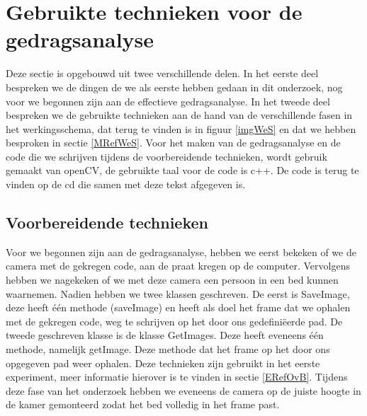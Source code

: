 \section{Gebruikte technieken voor de gedragsanalyse}
\label{MRefMGA}
Deze sectie is opgebouwd uit twee verschillende delen. In het eerste deel bespreken we de dingen de we als eerste hebben gedaan in dit onderzoek, nog voor we begonnen zijn aan de effectieve gedragsanalyse. In het tweede deel bespreken we de gebruikte technieken aan de hand van de verschillende fasen in het werkingsschema, dat terug te vinden is in figuur \ref{imgWeS} en dat we hebben besproken in sectie \ref{MRefWeS}. Voor het maken van de gedragsanalyse en de code die we schrijven tijdens de voorbereidende technieken, wordt gebruik gemaakt van openCV, de gebruikte taal voor de code is c++. De code is terug te vinden op de cd die samen met deze tekst afgegeven is. 

\subsection{Voorbereidende technieken}
Voor we begonnen zijn aan de gedragsanalyse, hebben we eerst bekeken of we de camera met de gekregen code, aan de praat kregen op de computer. Vervolgens hebben we nagekeken of we met deze camera een persoon in een bed kunnen waarnemen. Nadien hebben we twee klassen geschreven. De eerst is SaveImage, deze heeft \'e\'en methode (saveImage) en heeft als doel het frame dat we ophalen met de gekregen code, weg te schrijven op het door ons gedefini\"eerde pad. De tweede geschreven klasse is de klasse GetImages. Deze heeft eveneens \'e\'en methode, namelijk getImage. Deze methode dat het frame op het door ons opgegeven pad weer ophalen. Deze technieken zijn gebruikt in het eerste experiment, meer informatie hierover is te vinden in sectie \ref{ERefOvB}. Tijdens deze fase van het onderzoek hebben we eveneens de camera op de juiste hoogte in de kamer gemonteerd zodat het bed volledig in het frame past. 

